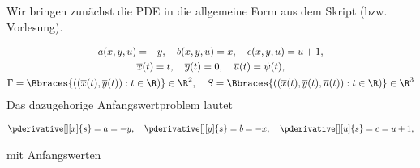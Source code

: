 \begin{solution}
	Wir bringen zunächst die PDE in die allgemeine Form aus dem Skript (bzw. Vorlesung).
	
	\begin{gather*}
	a(x, y, u) = -y,
	\quad
	b(x, y, u) = x,
	\quad
	c(x, y, u) = u + 1, \\
	\overline{x}(t) = t,
	\quad
	\overline{y}(t) = 0,
	\quad
	\overline{u}(t) = \psi(t), \\
	\Gamma = \Bbraces
	{
		(
		(
		\overline{x}(t),
		\overline{y}(t)
		):
		t \in \R
		)
	} \in \R^2,
	\quad
	S = \Bbraces
	{
		(
		(
		\overline{x}(t),
		\overline{y}(t),
		\overline{u}(t)
		):
		t \in \R
		)
	} \in \R^3
	\end{gather*}
	Das dazugehorige Anfangswertproblem lautet
	
	\begin{align*}
	\pderivative[][x]{s} = a = -y, \quad
	\pderivative[][y]{s} = b = -x, \quad
	\pderivative[][u]{s} = c = u + 1,
	\end{align*}
	
	mit Anfangswerten
	

\end{solution}
